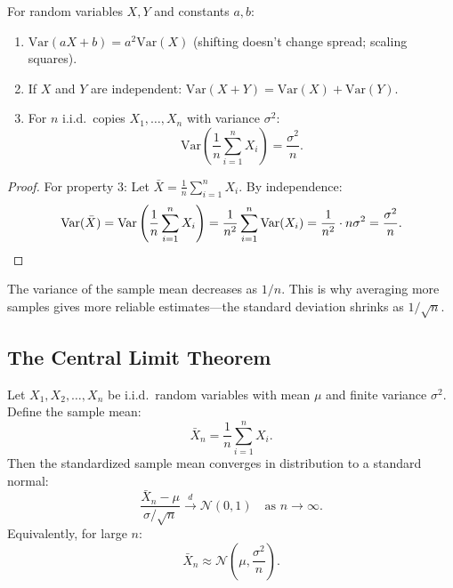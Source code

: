 \begin{proposition}
    For random variables $X, Y$ and constants $a, b$:
    \begin{enumerate}
        \item $\mathrm{Var}(aX + b) = a^2 \mathrm{Var}(X)$ (shifting doesn't change spread; scaling squares).
        \item If $X$ and $Y$ are independent: $\mathrm{Var}(X + Y) = \mathrm{Var}(X) + \mathrm{Var}(Y)$.
        \item For $n$ i.i.d.\ copies $X_1, \ldots, X_n$ with variance $\sigma^2$:
              \[
                  \mathrm{Var}\left(\frac{1}{n}\sum_{i=1}^n X_i\right) = \frac{\sigma^2}{n}.
              \]
    \end{enumerate}
\end{proposition}

\begin{proof}
    For property 3: Let $\bar{X} = \frac{1}{n}\sum_{i=1}^n X_i$. By independence:
    \[
        \mathrm{Var}(\bar{X}) = \mathrm{Var}\left(\frac{1}{n}\sum_{i=1}^n X_i\right) = \frac{1}{n^2} \sum_{i=1}^n \mathrm{Var}(X_i) = \frac{1}{n^2} \cdot n\sigma^2 = \frac{\sigma^2}{n}. \qedhere
    \]
\end{proof}

\begin{remark}
    The variance of the sample mean decreases as $1/n$. This is why averaging more samples gives more reliable estimates---the standard deviation shrinks as $1/\sqrt{n}$.
\end{remark}

\subsection{The Central Limit Theorem}

\begin{theorem}
    Let $X_1, X_2, \ldots, X_n$ be i.i.d.\ random variables with mean $\mu$ and finite variance $\sigma^2$. Define the sample mean:
    \[
        \bar{X}_n = \frac{1}{n} \sum_{i=1}^n X_i.
    \]
    Then the standardized sample mean converges in distribution to a standard normal:
    \[
        \frac{\bar{X}_n - \mu}{\sigma / \sqrt{n}} \xrightarrow{d} \mathcal{N}(0, 1) \quad \text{as } n \to \infty.
    \]
    Equivalently, for large $n$:
    \[
        \bar{X}_n \approx \mathcal{N}\left(\mu, \frac{\sigma^2}{n}\right).
    \]
\end{theorem}

